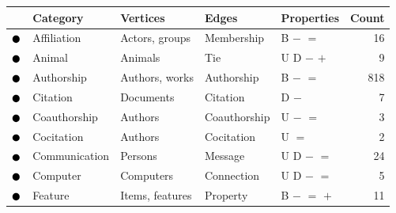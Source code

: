 \begin{tabular}{lllllr}
\toprule
& \textbf{Category} & \textbf{Vertices} & \textbf{Edges} & \textbf{Properties} & \textbf{Count} \\
\midrule
\textcolor{colorAffiliation}{$\newmoon$} &Affiliation & Actors, groups & Membership & \phantom{U} \phantom{D} B $-$ $=$ \phantom{$+$} \phantom{$\pm$} \phantom{$\stackrel{+}{=}$} \phantom{$*$} \phantom{$_*{}^*$} \phantom{$\rightleftarrows$} \phantom{$++$}  &  16\\
\textcolor{colorAnimal}{$\newmoon$} &Animal & Animals & Tie & U D \phantom{B} $-$ \phantom{$=$} $+$ \phantom{$\pm$} \phantom{$\stackrel{+}{=}$} \phantom{$*$} \phantom{$_*{}^*$} \phantom{$\rightleftarrows$} \phantom{$++$}  &  9\\
\textcolor{colorAuthorship}{$\newmoon$} &Authorship & Authors, works & Authorship & \phantom{U} \phantom{D} B $-$ $=$ \phantom{$+$} \phantom{$\pm$} \phantom{$\stackrel{+}{=}$} \phantom{$*$} \phantom{$_*{}^*$} \phantom{$\rightleftarrows$} \phantom{$++$}  &  818\\
\textcolor{colorCitation}{$\newmoon$} &Citation & Documents & Citation & \phantom{U} D \phantom{B} $-$ \phantom{$=$} \phantom{$+$} \phantom{$\pm$} \phantom{$\stackrel{+}{=}$} \phantom{$*$} \phantom{$_*{}^*$} \phantom{$\rightleftarrows$} \phantom{$++$}  &  7\\
\textcolor{colorCoauthorship}{$\newmoon$} &Coauthorship & Authors & Coauthorship & U \phantom{D} \phantom{B} $-$ $=$ \phantom{$+$} \phantom{$\pm$} \phantom{$\stackrel{+}{=}$} \phantom{$*$} \phantom{$_*{}^*$} \phantom{$\rightleftarrows$} \phantom{$++$}  &  3\\
\textcolor{colorCocitation}{$\newmoon$} &Cocitation & Authors & Cocitation & U \phantom{D} \phantom{B} \phantom{$-$} $=$ \phantom{$+$} \phantom{$\pm$} \phantom{$\stackrel{+}{=}$} \phantom{$*$} \phantom{$_*{}^*$} \phantom{$\rightleftarrows$} \phantom{$++$}  &  2\\
\textcolor{colorCommunication}{$\newmoon$} &Communication & Persons & Message & U D \phantom{B} $-$ $=$ \phantom{$+$} \phantom{$\pm$} \phantom{$\stackrel{+}{=}$} \phantom{$*$} \phantom{$_*{}^*$} \phantom{$\rightleftarrows$} \phantom{$++$}  &  24\\
\textcolor{colorComputer}{$\newmoon$} &Computer & Computers & Connection & U D \phantom{B} $-$ $=$ \phantom{$+$} \phantom{$\pm$} \phantom{$\stackrel{+}{=}$} \phantom{$*$} \phantom{$_*{}^*$} \phantom{$\rightleftarrows$} \phantom{$++$}  &  5\\
\textcolor{colorFeature}{$\newmoon$} &Feature & Items, features & Property & \phantom{U} \phantom{D} B $-$ $=$ $+$ \phantom{$\pm$} \phantom{$\stackrel{+}{=}$} \phantom{$*$} \phantom{$_*{}^*$} \phantom{$\rightleftarrows$} \phantom{$++$}  &  11\\

\end{tabular}
